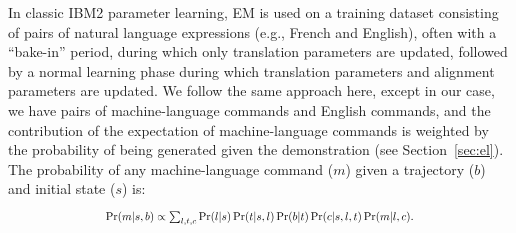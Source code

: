 \documentclass[conference]{IEEEtran}
\newcommand*{\Scale}[2][4]{\scalebox{#1}{$#2$}}%
\begin{document}
In classic IBM2 parameter learning, EM is used on a training dataset consisting of pairs of natural language expressions (e.g., French and English), often with a ``bake-in'' period, during which only translation parameters are updated, followed by a normal learning phase during which translation parameters and alignment parameters are updated. We follow the same approach here, except in our case, we have pairs of machine-language commands and English commands, and the contribution of the expectation of machine-language commands is weighted by the probability of being generated given the demonstration (see Section~\ref{sec:el}). The probability of any machine-language command ($m$) given a trajectory ($b$) and initial state ($s$) is:
\begin{equation}
\Scale[0.8]{
\Pr(m | s, b) \propto \sum_{l,t,c} \Pr(l | s) \Pr(t | s, l) \Pr(b | t) \Pr(c | s, l, t) \Pr(m | l, c).
}
\end{equation}




\end{document}
